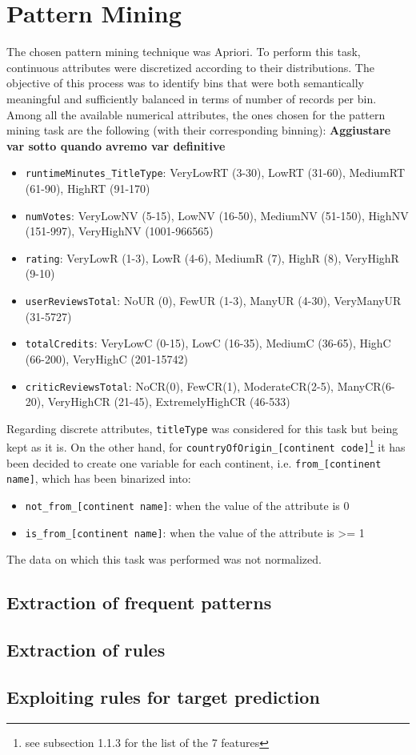 \chapter{Pattern Mining}
\label{ch:capitolo2}
The chosen pattern mining technique was Apriori. To perform this task, continuous attributes were discretized according to their distributions. 
The objective of this process was to identify bins that were both semantically meaningful and sufficiently balanced in terms of number of records per bin. 
Among all the available numerical attributes, the ones chosen for the pattern mining task are the following (with their corresponding binning):
\textbf{Aggiustare var sotto quando avremo var definitive }
\begin{itemize}
    \item \texttt{runtimeMinutes\_TitleType}: VeryLowRT (3-30), LowRT (31-60), MediumRT (61-90), HighRT (91-170) 
    \item \texttt{numVotes}: VeryLowNV (5-15), LowNV (16-50), MediumNV (51-150), HighNV (151-997), VeryHighNV (1001-966565) 
    \item \texttt{rating}: VeryLowR (1-3), LowR (4-6), MediumR (7), HighR (8), VeryHighR (9-10)
    \item \texttt{userReviewsTotal}: NoUR (0), FewUR (1-3), ManyUR (4-30), VeryManyUR (31-5727)
    \item \texttt{totalCredits}: VeryLowC (0-15), LowC (16-35), MediumC (36-65), HighC (66-200), VeryHighC (201-15742)
    \item \texttt{criticReviewsTotal}: NoCR(0), FewCR(1), ModerateCR(2-5), ManyCR(6-20), VeryHighCR (21-45), ExtremelyHighCR (46-533)
\end{itemize}

Regarding discrete attributes, \texttt{titleType} was considered for this task but being kept as it is. 
On the other hand, for \texttt{countryOfOrigin\_[continent code]}\footnote{see subsection 1.1.3 for the list of the 7 features} it has been decided to create one variable for each continent, i.e. \texttt{from\_[continent name]}, which has been binarized into:
\begin{itemize}
    \item \texttt{not\_from\_[continent name]}: when the value of the attribute is 0
    \item \texttt{is\_from\_[continent name]}: when the value of the attribute is >= 1
\end{itemize}

The data on which this task was performed was not normalized. 

\section{Extraction of frequent patterns}\label{sec:freq_patterns}


\section{Extraction of rules}\label{sec:rules}



\section{Exploiting rules for target prediction}\label{sec:prediction_rules}
